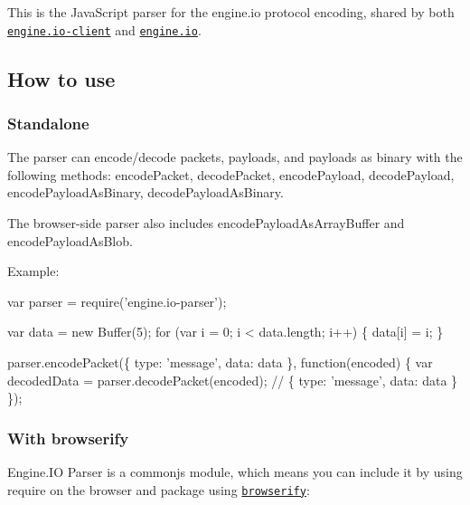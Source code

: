 \href{http://travis-ci.org/socketio/engine.io-parser}{\tt } \href{http://badge.fury.io/js/engine.io-parser}{\tt }

This is the Java\+Script parser for the engine.\+io protocol encoding, shared by both \href{https://github.com/socketio/engine.io-client}{\tt engine.\+io-\/client} and \href{https://github.com/socketio/engine.io}{\tt engine.\+io}.

\subsection*{How to use}

\subsubsection*{Standalone}

The parser can encode/decode packets, payloads, and payloads as binary with the following methods\+: {\ttfamily encode\+Packet}, {\ttfamily decode\+Packet}, {\ttfamily encode\+Payload}, {\ttfamily decode\+Payload}, {\ttfamily encode\+Payload\+As\+Binary}, {\ttfamily decode\+Payload\+As\+Binary}.

The browser-\/side parser also includes {\ttfamily encode\+Payload\+As\+Array\+Buffer} and {\ttfamily encode\+Payload\+As\+Blob}.

Example\+:


\begin{DoxyCode}
var parser = require('engine.io-parser');

var data = new Buffer(5);
for (var i = 0; i < data.length; i++) \{ data[i] = i; \}

parser.encodePacket(\{ type: 'message', data: data \}, function(encoded) \{
  var decodedData = parser.decodePacket(encoded); // \{ type: 'message', data: data \}
\});
\end{DoxyCode}


\subsubsection*{With browserify}

Engine.\+IO Parser is a commonjs module, which means you can include it by using {\ttfamily require} on the browser and package using \href{http://browserify.org/}{\tt browserify}\+:


